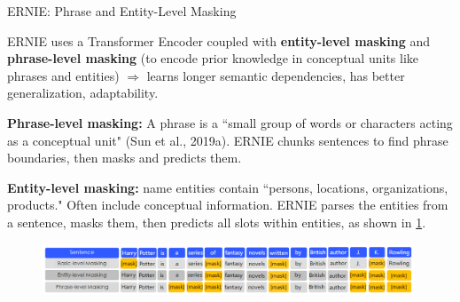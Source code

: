 \begin{frame}{ERNIE: Phrase and Entity-Level Masking}

    \begin{itemizeSpaced}{5pt}
        \item ERNIE uses a Transformer Encoder coupled with \textbf{entity-level masking} and \textbf{phrase-level masking} (to encode prior knowledge in {\color{DodgerBlue} conceptual units} like phrases and entities) $\Rightarrow$ learns longer semantic dependencies, has better generalization, adaptability. 
        
        \item \textbf{Phrase-level masking: } A phrase is a ``small group of words or characters acting as a {\color{DodgerBlue} conceptual unit}" (Sun et al., 2019a). ERNIE chunks sentences to find phrase boundaries, then masks and predicts them. 
        
        \item \textbf{Entity-level masking: } name entities contain ``persons, locations, organizations, products." Often include conceptual information. ERNIE parses the entities from a sentence, masks them, then predicts all slots within entities, as shown in \cref{fig:ernie_maskingTypes}.
        
    \end{itemizeSpaced}
    
    
    
    \begin{figure}[h]
    \vspace{-5pt}
    \centering
    \includegraphics[width=0.99\textwidth]{imgs/ernie_maskingtypes.png}
    \vspace{-5pt}
    \vspace{-5pt}
    \label{fig:ernie_maskingTypes}
    \end{figure}
    
    
\end{frame}



